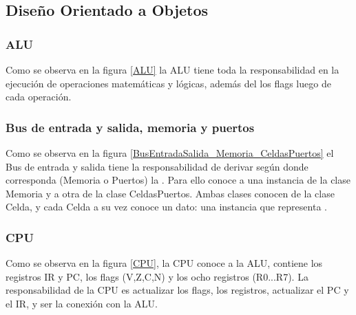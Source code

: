 \subsection{Diseño Orientado a Objetos}

\subsubsection{ALU}
Como se observa en la figura \ref{ALU} la ALU tiene toda la responsabilidad en la ejecución de operaciones matemáticas y lógicas, además del  los flags luego de cada operación. 


\subsubsection{Bus de entrada y salida, memoria y puertos}
Como se observa en la figura \ref{BusEntradaSalida_Memoria_CeldasPuertos} el Bus de entrada y salida tiene la responsabilidad de derivar según donde corresponda (Memoria o Puertos) la . Para ello conoce a una instancia de la clase Memoria y a otra de la clase CeldasPuertos. 
Ambas clases conocen  de la clase Celda, y cada Celda a su vez conoce un dato: una instancia  que representa .  


\subsubsection{CPU}
Como se observa en la figura \ref{CPU}, la CPU conoce a la ALU, contiene los registros IR y PC, los flags (V,Z,C,N) y los ocho registros  (R0...R7). La responsabilidad de la CPU es actualizar los flags, los registros, actualizar el PC y el IR, y ser la conexión con la ALU.


